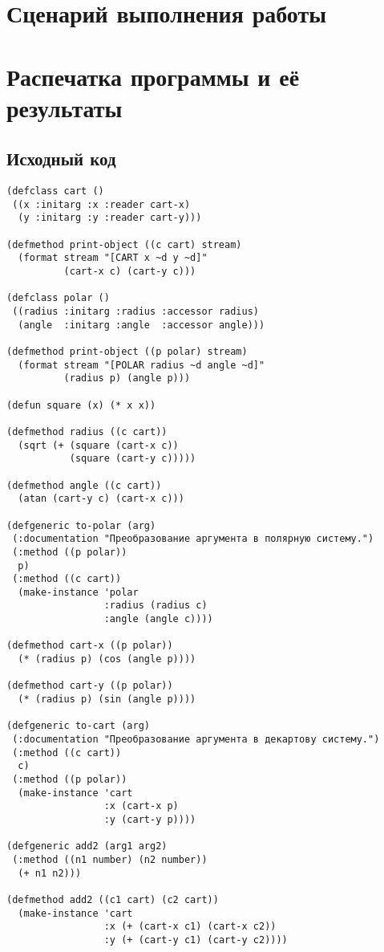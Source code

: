 \documentclass[12pt]{article}
\begin{document}
\section{Сценарий выполнения работы}

\section{Распечатка программы и её результаты}

\subsection{Исходный код}
\begin{verbatim}
(defclass cart ()
 ((x :initarg :x :reader cart-x)
  (y :initarg :y :reader cart-y)))

(defmethod print-object ((c cart) stream)
  (format stream "[CART x ~d y ~d]"
          (cart-x c) (cart-y c)))

(defclass polar ()
 ((radius :initarg :radius :accessor radius)
  (angle  :initarg :angle  :accessor angle)))

(defmethod print-object ((p polar) stream)
  (format stream "[POLAR radius ~d angle ~d]"
          (radius p) (angle p)))

(defun square (x) (* x x))

(defmethod radius ((c cart))
  (sqrt (+ (square (cart-x c))
           (square (cart-y c)))))

(defmethod angle ((c cart))
  (atan (cart-y c) (cart-x c)))

(defgeneric to-polar (arg)
 (:documentation "Преобразование аргумента в полярную систему.")
 (:method ((p polar))
  p)
 (:method ((c cart))
  (make-instance 'polar
                 :radius (radius c)
                 :angle (angle c))))

(defmethod cart-x ((p polar))
  (* (radius p) (cos (angle p))))

(defmethod cart-y ((p polar))
  (* (radius p) (sin (angle p))))

(defgeneric to-cart (arg)
 (:documentation "Преобразование аргумента в декартову систему.")
 (:method ((c cart))
  c)
 (:method ((p polar))
  (make-instance 'cart
                 :x (cart-x p)
                 :y (cart-y p))))

(defgeneric add2 (arg1 arg2)
 (:method ((n1 number) (n2 number))
  (+ n1 n2)))

(defmethod add2 ((c1 cart) (c2 cart))
  (make-instance 'cart
                 :x (+ (cart-x c1) (cart-x c2))
                 :y (+ (cart-y c1) (cart-y c2))))


\end{verbatim}
\end{document}
